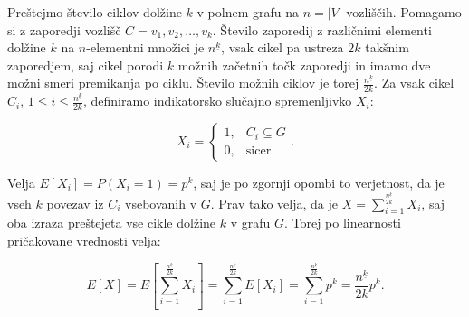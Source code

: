 \documentclass[mat1, tisk]{fmfdelo}
\begin{document}
    \begin{dokaz}
        Preštejmo število ciklov dolžine $k$ v polnem grafu na $n = |V|$ vozliščih. Pomagamo si z zaporedji vozlišč $C = v_1,v_2,\ldots,v_k$. Število zaporedij z različnimi elementi dolžine $k$ na $n$-elementni množici je $n^{\underline{k}}$, vsak cikel
        pa ustreza $2k$ takšnim zaporedjem, saj cikel porodi $k$ možnih začetnih točk zaporedji in imamo dve možni smeri premikanja po ciklu. Število možnih ciklov je torej $\frac{n^{\underline{k}}}{2k}$. Za vsak cikel $C_i$, $1 \leq i \leq \frac{n^{\underline{k}}}{2k}$,
        definiramo indikatorsko slučajno spremenljivko $X_i$:

        $$X_i = \begin{cases}
            1, & C_i \subseteq G \\
            0, & \text{sicer}
        \end{cases}.$$

        Velja $E[X_i] = P(X_i = 1) = p^k$, saj je po zgornji opombi to verjetnost, da je vseh $k$ povezav iz $C_i$ vsebovanih v $G$. Prav tako velja, da je $X = \sum_{i=1}^{\frac{n^{\underline{k}}}{2k}}X_i$, saj oba izraza preštejeta vse cikle dolžine $k$
        v grafu $G$. Torej po linearnosti pričakovane vrednosti velja:

        $$E[X] = E[\sum_{i=1}^{\frac{n^{\underline{k}}}{2k}}X_i] = \sum_{i=1}^{\frac{n^{\underline{k}}}{2k}}E[X_i] = \sum_{i=1}^{\frac{n^{\underline{k}}}{2k}}p^k = \frac{n^{\underline{k}}}{2k}p^k.$$
    \end{dokaz}



\end{document}
